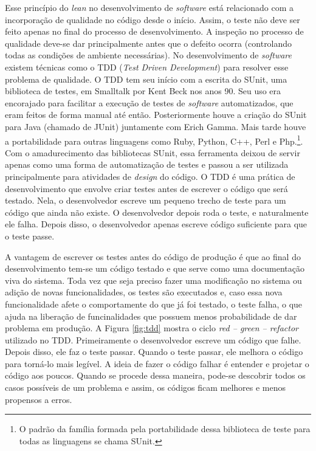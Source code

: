 Esse princípio do \textit{lean} no desenvolvimento de \textit{software} está relacionado com a incorporação de qualidade no código desde o início. Assim, o teste não deve ser feito apenas no final do processo de desenvolvimento. A inspeção no processo de qualidade deve-se dar principalmente antes que o defeito ocorra (controlando todas as condições de ambiente necessárias). 
No desenvolvimento de \textit{software} existem técnicas como o TDD (\textit{Test Driven Development}) para resolver esse problema de qualidade. 	
O TDD tem seu início com a escrita do SUnit, uma biblioteca de testes, em Smalltalk por Kent Beck nos anos 90. Seu uso era encorajado para facilitar a execução de testes de \textit{software} automatizados, que eram feitos de forma manual até então. Posteriormente houve a criação do SUnit para Java (chamado de JUnit) juntamente com Erich Gamma. Mais tarde houve a portabilidade para outras linguagens como Ruby, Python, C++, Perl e Php.\footnote{O padrão da família formada pela portabilidade dessa biblioteca de teste para todas as linguagens se chama SUnit.}. Com o amadurecimento das bibliotecas SUnit, essa ferramenta deixou de servir apenas como uma forma de automatização de testes e passou a ser utilizada principalmente para atividades de \textit{design} do código. O TDD é uma prática de desenvolvimento que envolve criar testes antes de escrever o código que será testado. Nela, o desenvolvedor escreve um pequeno trecho de teste para um código que ainda não existe. O desenvolvedor depois roda o teste, e naturalmente ele falha. Depois disso, o desenvolvedor apenas escreve código suficiente para que o teste passe. \cite{barauna:13}

A vantagem de escrever os testes antes do código de produção é que ao final do desenvolvimento tem-se um código testado e que serve como uma documentação viva do sistema. Toda vez que seja preciso fazer uma modificação no sistema ou adição de novas funcionalidades, os testes são executados e, caso essa nova funcionalidade afete o comportamente do que já foi testado, o teste falha, o que ajuda na liberação de funcinalidades que possuem menos probabilidade de dar problema em produção. A Figura \ref{fig:tdd} mostra o ciclo \textit{red -- green -- refactor} utilizado no TDD. Primeiramente o desenvolvedor escreve um código que falhe. Depois disso, ele faz o teste passar. Quando o teste passar, ele melhora o código para torná-lo mais legível. A ideia de fazer o código falhar é entender e projetar o código aos poucos. Quando se procede dessa maneira, pode-se descobrir todos os casos possíveis de um problema e assim, os códigos ficam melhores e menos propensos a erros.


